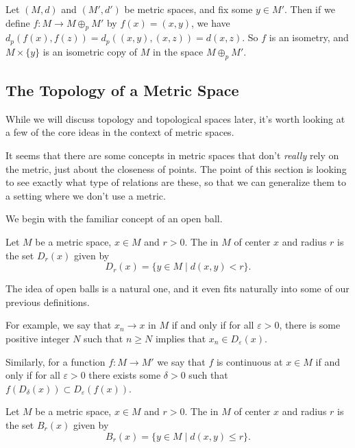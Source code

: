 \documentclass[a4paper]{scrartcl}
\begin{document}
\begin{example}
    Let $(M,d)$ and $(M', d')$ be metric spaces, and fix some $y \in M'$. Then if we define $f: M \rightarrow M \oplus_p M'$ by $f(x) = (x, y)$, we have $d_p(f(x), f(z)) = d_p((x, y), (x, z)) = d(x, z)$. So $f$ is an isometry, and $M \times \{y\}$ is an isometric copy of $M$ in the space $M \oplus_p M'$. 
\end{example}

\subsection{The Topology of a Metric Space}

While we will discuss topology and topological spaces later, it's worth looking at a few of the core ideas in the context of metric spaces.

It seems that there are some concepts in metric spaces that don't \emph{really} rely on the metric, just about the closeness of points. The point of this section is looking to see exactly what type of relations are these, so that we can generalize them to a setting where we don't use a metric.

We begin with the familiar concept of an open ball.

\begin{definition}
    Let $M$ be a metric space, $x \in M$ and $r > 0$. The  in $M$ of center $x$ and radius $r$ is the set $D_r(x)$ given by
    $$
    D_r(x) = \{y \in M \mid d(x, y) < r \}.
    $$
\end{definition}

The idea of open balls is a natural one, and it even fits naturally into some of our previous definitions.

For example, we say that $x_n \rightarrow x$ in $M$ if and only if for all $\varepsilon > 0$, there is some positive integer $N$ such that $n \geq N$ implies that $x_n \in D_{\varepsilon}(x)$.

Similarly, for a function $f: M \rightarrow M'$ we say that $f$ is continuous at $x \in M$ if and only if for all $\varepsilon > 0$ there exists some $\delta > 0$ such that $f(D_{\delta}(x)) \subset D_{\varepsilon}(f(x))$.

\begin{definition}
    Let $M$ be a metric space, $x \in M$ and $r > 0$. The  in $M$ of center $x$ and radius $r$ is the set $B_r(x)$ given by
    $$
B_r(x) = \{y \in M \mid d(x, y) \leq r\}.
    $$
\end{definition}
\end{document}
